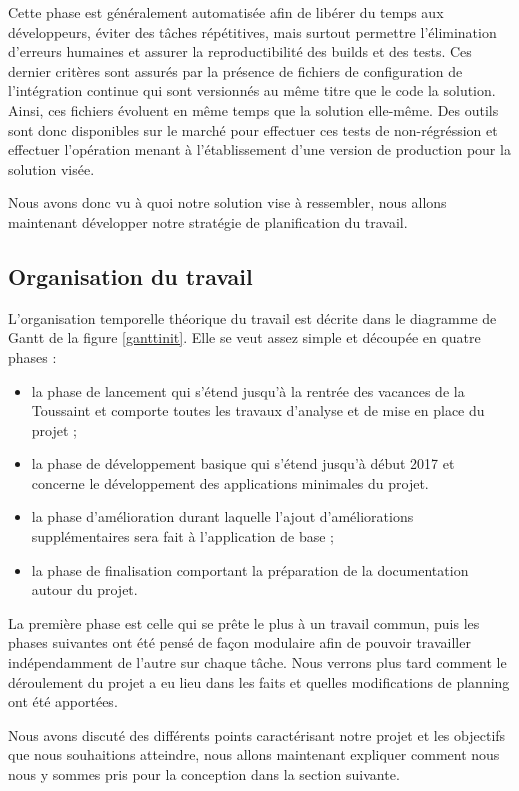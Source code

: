 Cette phase est généralement automatisée afin de libérer du temps aux développeurs, éviter des tâches répétitives, mais surtout permettre l'élimination d'erreurs humaines et assurer la reproductibilité des builds et des tests. Ces dernier critères sont assurés par la présence de fichiers de configuration de l'intégration continue qui sont versionnés au même titre que le code la solution. Ainsi, ces fichiers évoluent en même temps que la solution elle-même.
Des outils sont donc disponibles sur le marché pour effectuer ces tests de non-régréssion et effectuer l'opération menant à l'établissement d'une version de production pour la solution visée.

Nous avons donc vu à quoi notre solution vise à ressembler, nous allons maintenant développer notre stratégie de planification du travail.

\subsection{Organisation du travail}

L'organisation temporelle théorique du travail est décrite dans le diagramme de Gantt de la figure \ref{ganttinit}. Elle se veut assez simple et découpée en quatre phases :

\begin{itemize}
    \item la phase de lancement qui s’étend jusqu’à la rentrée des vacances de la Toussaint et comporte toutes les travaux d’analyse et de mise en place du projet ;
    \item la phase de développement basique qui s’étend jusqu’à début 2017 et concerne le développement des applications minimales du projet.
    \item la phase d’amélioration durant laquelle l’ajout d’améliorations supplémentaires sera fait à l’application de base ;
    \item la phase de finalisation comportant la préparation de la documentation autour du projet.
\end{itemize}

La première phase est celle qui se prête le plus à un travail commun, puis les phases suivantes ont été pensé de façon modulaire afin de pouvoir travailler indépendamment de l’autre sur chaque tâche. Nous verrons plus tard comment le déroulement du projet a eu lieu dans les faits et quelles modifications de planning ont été apportées.

Nous avons discuté des différents points caractérisant notre projet et les objectifs que nous souhaitions atteindre, nous allons maintenant expliquer comment nous nous y sommes pris pour la conception dans la section suivante.

